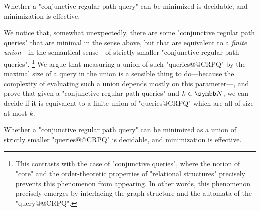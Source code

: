 \begin{contribution}
	Whether a "conjunctive regular path query" can be minimized is decidable,
	and minimization is effective.
\end{contribution}

We notice that, somewhat unexpectedly, there are some "conjunctive regular path queries"
that are minimal in the sense above, but that are equivalent to a \emph{finite union}---in the 
semantical sense---of strictly smaller "conjunctive regular path queries".%
\footnote{This contrasts with the case of "conjunctive queries",
where the notion of "core" and the order-theoretic properties
of "relational structures" precisely prevents this phenomenon from appearing.
In other words, this phenomenon precisely emerges by interlacing
the graph structure and the automata of the "query@@CRPQ".}
We argue that measuring a union of such "queries@@CRPQ" by the maximal size
of a query in the union is a sensible thing to do---because the complexity
of evaluating such a union depends mostly on this parameter---, and prove
that given a "conjunctive regular path queries" and $k\in\N$, we can
decide if it is equivalent to a finite union of
"queries@CRPQ" which are all of size at most $k$.

\begin{contribution}
	Whether a "conjunctive regular path query" can be minimized
	as a union of strictly smaller "queries@@CRPQ" is decidable,
	and minimization is effective.
\end{contribution}

